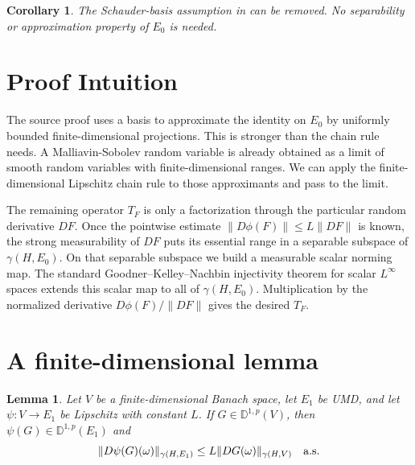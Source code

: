 \documentclass[11pt]{article}
\newtheorem{lemma}{Lemma}
\newtheorem{corollary}{Corollary}
\newcommand{\D}{\mathbb{D}}
\newcommand{\g}{\gamma}
\newcommand{\1}{\mathbf 1}
\begin{document}
\begin{corollary}
The Schauder-basis assumption in \cite[Proposition 3.10]{PV} can be removed.
No separability or approximation property of \(E_0\) is needed.
\end{corollary}

\section*{Proof Intuition}

The source proof uses a basis to approximate the identity on \(E_0\) by
uniformly bounded finite-dimensional projections.  This is stronger than the
chain rule needs.  A Malliavin-Sobolev random variable is already obtained as a
limit of smooth random variables with finite-dimensional ranges.  We can apply
the finite-dimensional Lipschitz chain rule to those approximants and pass to
the limit.

The remaining operator \(T_F\) is only a factorization through the particular
random derivative \(DF\).  Once the pointwise estimate
\(\|D\phi(F)\|\leq L\|DF\|\) is known, the strong measurability of \(DF\) puts
its essential range in a separable subspace of \(\g(H,E_0)\).  On that
separable subspace we build a measurable scalar norming map.  The standard
Goodner--Kelley--Nachbin injectivity theorem for scalar \(L^\infty\) spaces
extends this scalar map to all of \(\g(H,E_0)\).  Multiplication by the
normalized derivative \(D\phi(F)/\|DF\|\) gives the desired \(T_F\).

\section*{A finite-dimensional lemma}

\begin{lemma}\label{lem:finite}
Let \(V\) be a finite-dimensional Banach space, let \(E_1\) be UMD, and let
\(\psi:V\to E_1\) be Lipschitz with constant \(L\).  If
\(G\in\D^{1,p}(V)\), then \(\psi(G)\in\D^{1,p}(E_1)\) and
\[
  \|D\psi(G)(\omega)\|_{\g(H,E_1)}
  \leq L\|DG(\omega)\|_{\g(H,V)}
  \quad\hbox{a.s.}
\]
\end{lemma}
\end{document}
